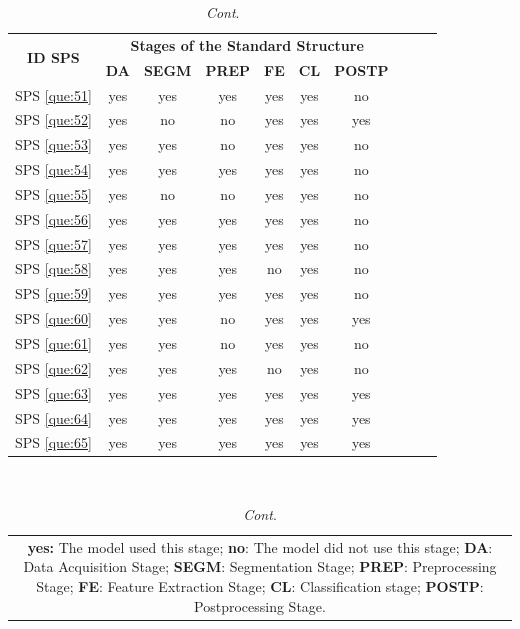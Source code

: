 \documentclass[sensors,review,accept,moreauthors,pdftex]{Definitions/mdpi}
\begin{document}
	\begin{table}[H]\ContinuedFloat
	\centering
\caption{\textit{Cont}.}
\begin{tabular}{cccccccccc}
	\toprule
	\multirow{2}{*}{\textbf{ID SPS}\vspace{-5pt}
}&\multicolumn{6}{c}{\textbf{Stages of the Standard Structure}}\\ \cmidrule{2-7}
	
	
	
	&\textbf{DA}&\textbf{SEGM}&\textbf{PREP}&\textbf{FE}&\textbf{CL} &\textbf{POSTP}\\
\midrule
		
		
		SPS \ref{que:51}&	yes	&	yes	&	yes	&	yes	&	yes	&	no	\\
		
		SPS \ref{que:52}&	yes	&	no	&	no	&	yes	&	yes	&	yes	\\
		
		SPS \ref{que:53}&	yes	&	yes	&	no	&	yes	&	yes	&	no	\\
		
		SPS \ref{que:54}&	yes	&	yes	&	yes	&	yes	&	yes	&	no	\\
		
		SPS \ref{que:55}&	yes	&	no	&	no	&	yes	&	yes	&	no	\\
		
		SPS \ref{que:56}&	yes	&	yes	&	yes	&	yes	&	yes	&	no	\\
				
		
		
		SPS \ref{que:57}&	yes	&	yes	&	yes	&	yes	&	yes	&	no	\\	
		SPS \ref{que:58}&	yes	&	yes	&	yes	&	no	&	yes	&	no	\\	
		SPS \ref{que:59}&	yes	&	yes	&	yes	&	yes	&	yes	&	no	\\	
		SPS \ref{que:60}&	yes	&	yes	&	no	&	yes	&	yes	&	yes	\\	
		SPS \ref{que:61}&	yes	&	yes	&	no	&	yes	&	yes	&	no	\\	
		SPS \ref{que:62}&	yes	&	yes	&	yes	&	no	&	yes	&	no	\\	
		SPS \ref{que:63}&	yes	&	yes	&	yes	&	yes	&	yes	&	yes	\\	
		SPS \ref{que:64}&	yes	&	yes	&	yes	&	yes	&	yes	&	yes	\\	
		SPS \ref{que:65}&	yes	&	yes	&	yes	&	yes	&	yes	&	yes	\\	
		\bottomrule
	\end{tabular}\\
\begin{tabular}{@{}c@{}} 
\multicolumn{1}{p{\textwidth -.88in}}{\footnotesize \textbf{yes:} The model used this stage;\textbf{ no}: The model did not use this stage; \textbf{DA}: Data Acquisition Stage; \textbf{SEGM}: Segmentation Stage; \textbf{PREP}: Preprocessing Stage; \textbf{FE}: Feature Extraction Stage;  \textbf{CL}: Classification stage; \textbf{POSTP}: Postprocessing Stage.}
\end{tabular}



\end{table}
\end{document}
